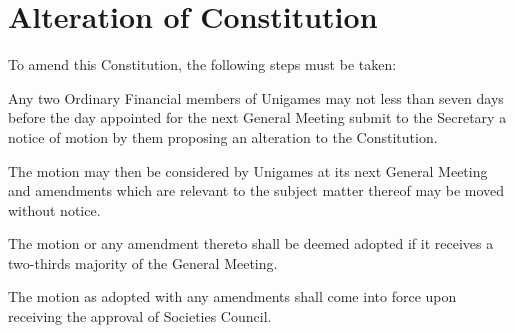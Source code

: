 \documentclass[a4paper]{article}
\begin{document}
\section{Alteration of Constitution} \label{sec:alteration}
\begin{myEnumerate}
    \item To amend this Constitution, the following steps must be taken:
          \begin{myEnumerate}
              \item Any two Ordinary Financial members of Unigames may not less than seven days before the day appointed for the next General Meeting submit to the Secretary a notice of motion by them proposing an alteration to the Constitution.
              \item The motion may then be considered by Unigames at its next General Meeting and amendments which are relevant to the subject matter thereof may be moved without notice.
              \item The motion or any amendment thereto shall be deemed adopted if it receives a two-thirds majority of the General Meeting.
              \item The motion as adopted with any amendments shall come into force upon receiving the approval of Societies Council.
          \end{myEnumerate}
\end{myEnumerate}
\end{document}

